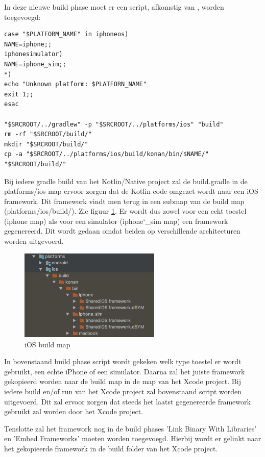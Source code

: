 In deze nieuwe build phase moet er een script, afkomstig van \textcite{AlbertGao}, worden toegevoegd: 
\begin{lstlisting}
case "$PLATFORM_NAME" in iphoneos)
NAME=iphone;;
iphonesimulator)
NAME=iphone_sim;;
*)
echo "Unknown platform: $PLATFORN_NAME"
exit 1;;
esac

"$SRCROOT/../gradlew" -p "$SRCROOT/../platforms/ios" "build"
rm -rf "$SRCROOT/build/"
mkdir "$SRCROOT/build/"
cp -a "$SRCROOT/../platforms/ios/build/konan/bin/$NAME/" "$SRCROOT/build/"
\end{lstlisting}

Bij iedere gradle build van het Kotlin/Native project zal de build.gradle in de platforms/ios map ervoor zorgen dat de Kotlin code omgezet wordt naar een iOS framework. Dit framework vindt men terug in een submap van de build map (platforms/ios/build/). Zie figuur \ref{fig:stap6-build}. Er wordt dus zowel voor een echt toestel (iphone map) als voor een simulator (iphone\char`_sim map) een framework gegenereerd. Dit wordt gedaan omdat beiden op verschillende architecturen worden uitgevoerd.

\begin{figure} [ht]
	\centering
	\includegraphics[width=0.60\textwidth]{img/stap6-build.png}
	\caption{iOS build map}
	\label{fig:stap6-build}
\end{figure}

In bovenstaand build phase script wordt gekeken welk type toestel er wordt gebruikt, een echte iPhone of een simulator. Daarna zal het juiste framework gekopieerd worden naar de build map in de map van het Xcode project. Bij iedere build en/of run van het Xcode project zal bovenstaand script worden uitgevoerd. Dit zal ervoor zorgen dat steeds het laatst gegenereerde framework gebruikt zal worden door het Xcode project.

Tenslotte zal het framework nog in de build phases 'Link Binary With Libraries' en 'Embed Frameworks' moeten worden toegevoegd. Hierbij wordt er gelinkt naar het gekopieerde framework in de build folder van het Xcode project.

